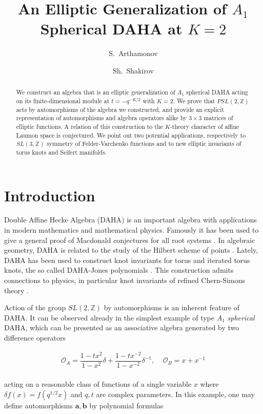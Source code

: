 \documentclass{amsart}
\title{An Elliptic Generalization of $A_1$ Spherical DAHA at $K=2$}
\author{S.~Arthamonov}
\author{Sh.~Shakirov}
\newcommand{\Oa}{\mathcal O_A}
\newcommand{\Ob}{\mathcal O_B}
\begin{document}
\begin{abstract}
We construct an algebra that is an elliptic generalization of $A_1$ spherical DAHA acting on its finite-dimensional module at $t=-q^{-K/2}$ with $K=2$. We prove that $PSL(2,{\mathbb Z})$ acts by automorphisms of the algebra we constructed, and provide an explicit representation of automorphisms and algebra operators alike by $3 \times 3$ matrices of elliptic functions. A relation of this construction to the $K$-theory character of affine Laumon space is conjectured. We point out two potential applications, respectively to $SL(3,{\mathbb Z})$ symmetry of Felder-Varchenko functions and to new elliptic invariants of torus knots and Seifert manifolds.    
\end{abstract}
\maketitle

\section{Introduction}

Double Affine Hecke Algebra (DAHA) \cite{Cherednik'1992, Cherednik'2005} is an important algebra with applications in modern mathematics and mathematical physics. Famously it has been used to give a general proof of Macdonald conjectures for all root systems \cite{Cherednik'1995}. In algebraic geometry, DAHA is related to the study of the Hilbert scheme of points \cite{GorskyNegut'2015}. Lately, DAHA has been used to construct knot invariants for torus and iterated torus knots, the so called DAHA-Jones polynomials \cite{Cherednik'2013,CherednikDanilenko'2016}. This construction admits connections to physics, in particular knot invariants of refined Chern-Simons theory \cite{AganagicShakirov'2015}.

Action of the group $SL(2,{\mathbb Z})$ by automorphisms is an inherent feature of DAHA. It can be observed already in the simplest example of type $A_1$ \emph{spherical} DAHA, which can be presented as an associative algebra generated by two difference operators  

\begin{align}
\Oa = \dfrac{1 - t x^2}{1 - x^2} \delta + \dfrac{1 - t x^{-2}}{1 - x^{-2}} \delta^{-1}, \ \ \ \ \ \Ob = x + x^{-1}
\end{align}
\smallskip\\
acting on a reasonable class of functions of a single variable $x$ where $\delta f(x) = f( q^{1/2} x)$ and $q,t$ are complex parameters. In this  example, one may define automorphisms $\mathbf a,\mathbf b$ by polynomial formulas
\end{document}
